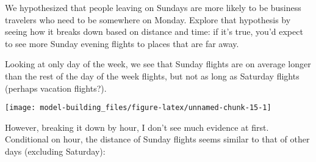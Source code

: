 \documentclass[]{book}
\newenvironment{Shaded}{\begin{snugshade}}{\end{snugshade}}
\newcommand{\DataTypeTok}[1]{\textcolor[rgb]{0.13,0.29,0.53}{#1}}
\newcommand{\KeywordTok}[1]{\textcolor[rgb]{0.13,0.29,0.53}{\textbf{#1}}}
\newcommand{\NormalTok}[1]{#1}
\newcommand{\OperatorTok}[1]{\textcolor[rgb]{0.81,0.36,0.00}{\textbf{#1}}}
\newcommand{\OtherTok}[1]{\textcolor[rgb]{0.56,0.35,0.01}{#1}}
\newcommand{\StringTok}[1]{\textcolor[rgb]{0.31,0.60,0.02}{#1}}
\theoremstyle{plain}
\theoremstyle{remark}
\begin{document}
We hypothesized that people leaving on Sundays are more likely to be
business travelers who need to be somewhere on Monday. Explore that
hypothesis by seeing how it breaks down based on distance and time: if
it's true, you'd expect to see more Sunday evening flights to places
that are far away.

Looking at only day of the week, we see that Sunday flights are on
average longer than the rest of the day of the week flights, but not as
long as Saturday flights (perhaps vacation flights?).

\begin{Shaded}
\end{Shaded}

\begin{center}\texttt{[image: model-building\_files/figure-latex/unnamed-chunk-15-1]} \end{center}

However, breaking it down by hour, I don't see much evidence at first.
Conditional on hour, the distance of Sunday flights seems similar to
that of other days (excluding Saturday):

\begin{Shaded}
\end{Shaded}
\end{document}
